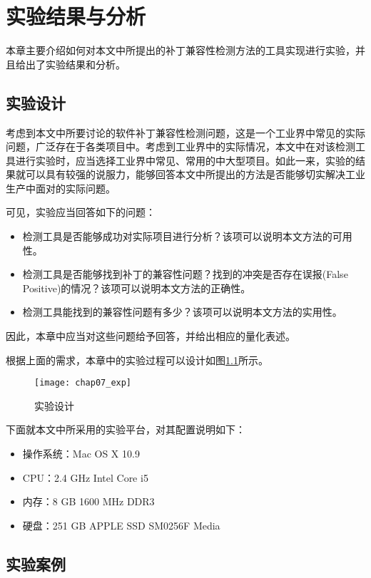 \chapter{实验结果与分析}
\label {exp}
本章主要介绍如何对本文中所提出的补丁兼容性检测方法的工具实现进行实验，并且给出了实验结果和分析。

\section{实验设计}

考虑到本文中所要讨论的软件补丁兼容性检测问题，这是一个工业界中常见的实际问题，广泛存在于各类项目中。考虑到工业界中的实际情况，本文中在对该检测工具进行实验时，应当选择工业界中常见、常用的中大型项目。如此一来，实验的结果就可以具有较强的说服力，能够回答本文中所提出的方法是否能够切实解决工业生产中面对的实际问题。

可见，实验应当回答如下的问题：
\begin{itemize}
	\item 检测工具是否能够成功对实际项目进行分析？该项可以说明本文方法的可用性。
	\item 检测工具是否能够找到补丁的兼容性问题？找到的冲突是否存在误报(False Positive)的情况？该项可以说明本文方法的正确性。
	\item 检测工具能找到的兼容性问题有多少？该项可以说明本文方法的实用性。
\end{itemize}

因此，本章中应当对这些问题给予回答，并给出相应的量化表述。

根据上面的需求，本章中的实验过程可以设计如图\ref {des_exp}所示。

\begin{figure}[H]
	\centering
	\texttt{[image: chap07\_exp]}
	\caption {实验设计}
	\label {des_exp}	
\end{figure}


下面就本文中所采用的实验平台，对其配置说明如下：
\begin{itemize}
	\item 操作系统：Mac OS X 10.9
	\item CPU：2.4 GHz Intel Core i5
	\item 内存：8 GB 1600 MHz DDR3
	\item 硬盘：251 GB APPLE SSD SM0256F Media
\end{itemize}

\section{实验案例}

